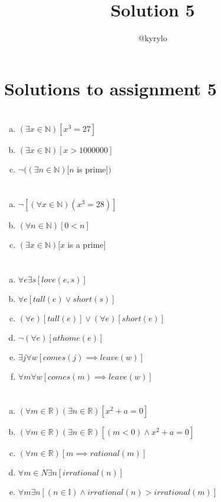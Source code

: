 \documentclass{article}
\title{Solution 5}
\author{@kyrylo}
\begin{document}
\section*{Solutions to assignment 5}

\section{}

\begin{enumerate}[(a)]
\item $(\exists x \in \mathbb{N})[x^3 = 27]$
\item $(\exists x \in \mathbb{N})[x > 1000000]$
\item $\neg((\exists n \in \mathbb{N})[n$ is prime$])$
\end{enumerate}

\section{}

\begin{enumerate}[(a)]
\item $\neg[(\forall x \in \mathbb{N})(x^3 = 28)]$
\item $(\forall n \in \mathbb{N})[0 < n]$
\item $(\exists x \in \mathbb{N})[x$ is a prime$]$
\end{enumerate}

\section{}

\begin{enumerate}[(a)]
\item $\forall e\exists s[love(e, s)]$
\item $\forall e[tall(e) \vee short(s)]$
\item $(\forall e)[tall(e)] \vee (\forall e)[short(e)]$
\item $\neg(\forall e)[athome(e)]$
\item $\exists j\forall w[comes(j) \implies leave(w)]$
\item $\forall m\forall w[comes(m) \implies leave(w)]$
\end{enumerate}

\section{}

\begin{enumerate}[(a)]
\item $(\forall m \in \mathbb{R})(\exists n \in \mathbb{R})[x^2 + a = 0]$
\item $(\forall m \in \mathbb{R})(\exists n \in \mathbb{R})[(m < 0) \wedge x^2 + a = 0]$
\item $(\forall m \in \mathbb{R})[m \implies rational(m)]$
\item $\forall m \in N \exists n[irrational(n)]$
\item $\forall m \exists n[(n \in \mathbb{I}) \wedge irrational(n) > irrational(m)]$
\end{enumerate}
\end{document}
